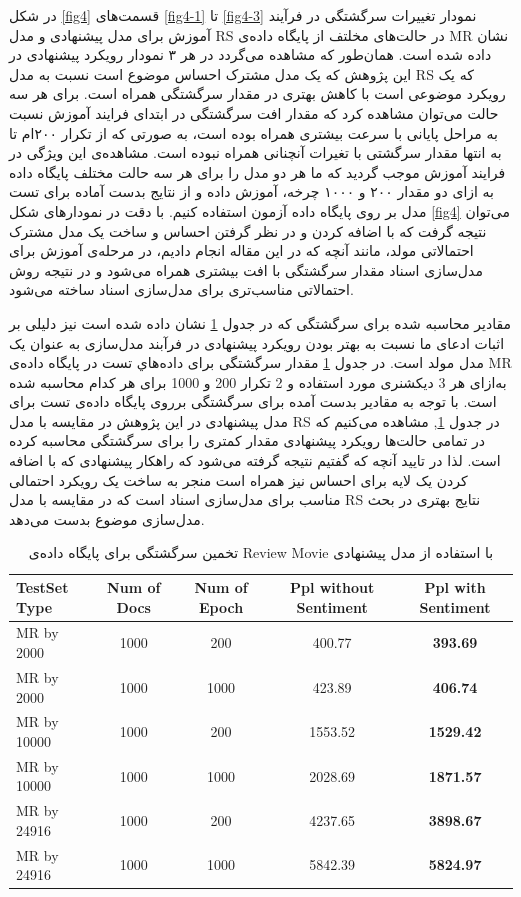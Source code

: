 \documentclass[12pt,a4paper]{article}
\begin{document}
در شکل 
\ref{fig4}
قسمت‌های
\ref{fig4-1}
تا
\ref{fig4-3}
نمودار تغییرات سرگشتگی در فرآیند آموزش برای مدل پیشنهادی و مدل RS در حالت‌های مخلتف از پایگاه داده‌ی MR نشان داده شده است. همان‌طور که مشاهده می‌‌گردد در هر ۳ نمودار رویکرد پیشنهادی در این پژوهش که یک مدل مشترک احساس موضوع است نسبت به مدل RS که یک رویکرد موضوعی است با کاهش بهتری در مقدار سرگشتگی همراه است.  برای هر سه حالت می‌‌توان مشاهده کرد که مقدار افت سرگشتگی در ابتدای فرایند آموزش نسبت به مراحل پایانی با سرعت بیشتری همراه بوده است، به صورتی‌ که از تکرار ۲۰۰ام تا به انتها مقدار سرگشتی با تغیرات آنچنانی همراه نبوده است. مشاهده‌ی این ویژگی‌ در فرایند آموزش موجب گردید که ما هر دو مدل را برای هر سه حالت مختلف پایگاه داده به ازای دو مقدار ۲۰۰ و ۱۰۰۰ چرخه‌، آموزش داده و از نتایج بدست آماده برای تست مدل بر روی پایگاه داده آزمون استفاده کنیم. با دقت در نمودار‌های شکل
\ref{fig4}
می‌توان نتیجه گرفت که با اضافه کردن و در نظر گرفتن احساس و ساخت یک مدل مشترک احتمالاتی مولد، مانند آنچه که در این مقاله انجام دادیم، در مرحله‌ی آموزش برای مدل‌سازی اسناد مقدار سرگشتگی با افت بیشتری همراه می‌‌شود و در نتیجه روش احتمالاتی مناسب‌تری برای مدل‌سازی اسناد ساخته می‌‌شود.

مقادير محاسبه شده برای سرگشتگی که در جدول 
\ref{tb3}
نشان داده شده است نيز دليلی بر اثبات ادعای ما نسبت به بهتر بودن رويکرد پيشنهادی در فرآبند مدل‌سازی به عنوان یک مدل مولد است. در جدول 
\ref{tb3}
مقدار سرگشتگی برای داده‌هاي تست در پايگاه داده‌ی MR به‌ازای هر 3 ديکشنری مورد استفاده و 2 تکرار 200 و 1000 برای هر کدام محاسبه شده است. با توجه به مقادير بدست آمده برای سرگشتگی برروی پایگاه داده‌ی تست برای مدل پیشنهادی در این پژوهش در مقايسه با مدل RS
در جدول 
\ref{tb3},
مشاهده می‌کنيم که در تمامی حالت‌ها رويکرد پيشنهادی مقدار کمتری را برای سرگشتگی محاسبه کرده است. لذا در تایید آنچه که گفتیم نتيجه گرفته می‌شود که راهکار پيشنهادی که با اضافه کردن يک لايه برای احساس نيز همراه است منجر به ساخت يک رويکرد احتمالی مناسب‌ برای مدل‌سازی اسناد است که در مقایسه با مدل RS نتایج بهتری در بحث مدل‌سازی موضوع بدست می‌دهد.

\begin{table}[!b]
	\footnotesize
	\centering
	\begin{latin}
		\begin{tabular}{|l|c|c|c|c|}
			\hline
			TestSet Type & Num of Docs & Num of Epoch & Ppl without Sentiment & Ppl with Sentiment \\
			\hline
			MR by 2000 & 1000 & 200 & 400.77 & \textbf{393.69 }\\
			\hline
			MR by 2000 & 1000 & 1000 & 423.89 & \textbf{406.74} \\
			\hline
			MR by 10000 & 1000 & 200 & 1553.52 & \textbf{1529.42} \\
			\hline
			MR by 10000 & 1000 & 1000 & 2028.69 & \textbf{1871.57} \\
			\hline
			MR by 24916 & 1000 & 200 & 4237.65 & \textbf{3898.67}\\
			\hline
			MR by 24916 & 1000 & 1000 & 5842.39 & \textbf{5824.97}\\
			\hline
		\end{tabular}
	\end{latin}
	\caption{تخمین سرگشتگی برای پایگاه داده‌ی Review Movie با استفاده از مدل پیشنهادی}
	\label{tb3}
\end{table}
\end{document}
